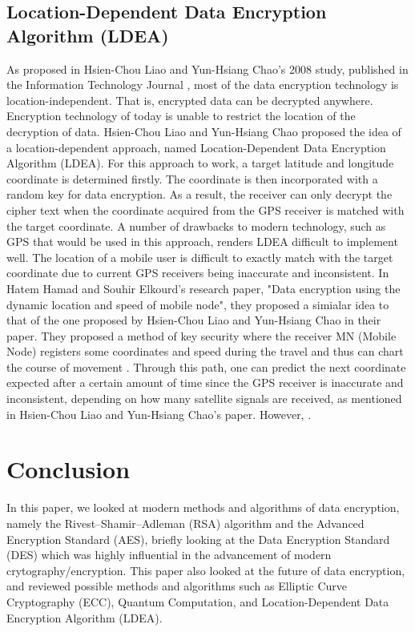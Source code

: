 \documentclass[journal]{IEEEtran}
\begin{document}
\subsection{\textbf{Location-Dependent Data Encryption Algorithm (LDEA)}}
As proposed in Hsien-Chou Liao and Yun-Hsiang Chao's 2008 study, published in the Information Technology Journal \cite{new_encryption_mobile}, most of the data encryption technology is location-independent. That is, encrypted data can be decrypted anywhere. Encryption technology of today is unable to restrict the location of the decryption of data. Hsien-Chou Liao and Yun-Hsiang Chao proposed the idea of a location-dependent approach, named Location-Dependent Data Encryption Algorithm (LDEA). For this approach to work, a target latitude and longitude coordinate is determined firstly. The coordinate is then incorporated with a random key for data encryption. As a result, the receiver can only decrypt the cipher text when the coordinate acquired from the GPS receiver is matched with the target coordinate. A number of drawbacks to modern technology, such as GPS that would be used in this approach, renders LDEA difficult to implement well. The location of a mobile user is difficult to exactly match with the target coordinate due to current GPS receivers being inaccurate and inconsistent.
\newline\newline
In Hatem Hamad and Souhir Elkourd's research paper, "Data encryption using the dynamic location and speed of mobile node", they proposed a simialar idea to that of the one proposed by Hsien-Chou Liao and Yun-Hsiang Chao in their paper. They proposed a method of key security where the receiver MN (Mobile Node) registers some coordinates and speed during the travel and thus can chart the course of movement \cite{encryption_mobile_node}. Through this path, one can predict the next coordinate expected after a certain amount of time since the GPS receiver is inaccurate and inconsistent, depending on how many satellite signals are received, as mentioned in Hsien-Chou Liao and Yun-Hsiang Chao's paper. However,  \cite{new_encryption_mobile}.
\section{\textbf{Conclusion}}
In this paper, we looked at modern methods and algorithms of data encryption, namely the Rivest–Shamir–Adleman (RSA) algorithm and the Advanced Encryption Standard (AES), briefly looking at the Data Encryption Standard (DES) which was highly influential in the advancement of modern crytography/encryption. This paper also looked at the future of data encryption, and reviewed possible methods and algorithms such as Elliptic Curve Cryptography (ECC), Quantum Computation, and Location-Dependent Data Encryption Algorithm (LDEA).

\bigskip

\printbibliography[title={References}]
\cite{AES}
\cite{DES_past&future}
\cite{RSA_concealing}
\cite{Encryption_Study}
\cite{DES}
\cite{new_encryption_mobile}
\cite{AES_fast}
\cite{quantum_computing_encryption}
\cite{encryption_mobile_node}
\end{document}
